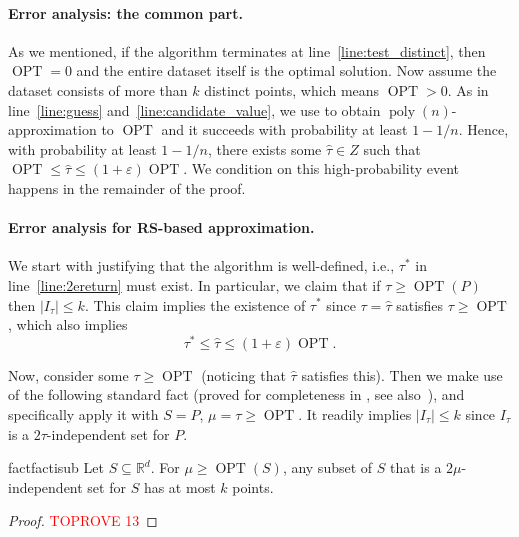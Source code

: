 \documentclass[11pt,letterpaper]{article}
\theoremstyle{plain}
\theoremstyle{definition}
\theoremstyle{remark}
\def\RR{{\mathbb{R}}}
\DeclareMathOperator{\poly}{poly}
\DeclareMathOperator{\OPT}{OPT}
\renewcommand{\epsilon}{\ensuremath{\varepsilon}}
\let\epsilon\varepsilon
\begin{document}
    




    
\paragraph{Error analysis: the common part.}
As we mentioned, if the algorithm terminates at line~\ref{line:test_distinct}, then $\OPT = 0$ and the entire dataset itself is the optimal solution.
Now assume the dataset consists of more than $k$ distinct points, which means $\OPT > 0$. 
As in line~\ref{line:guess} and~\ref{line:candidate_value}, we use  to obtain $\poly(n)$-approximation to $\OPT$
and it succeeds with probability at least $1-1/n$.
Hence, with probability at least $1-1/n$, there exists some $\hat{\tau}\in Z$ such that $\OPT\leq \hat{\tau}\leq (1+\varepsilon)\OPT$. 
We condition on this high-probability event happens in the remainder of the proof.


    
\paragraph{Error analysis for RS-based approximation.} 





We start with justifying that the algorithm is well-defined, i.e., $\tau^*$ in line~\ref{line:2ereturn} must exist.
In particular, we claim that if $\tau \geq \OPT(P)$ then $|I_\tau| \leq k$. 
This claim implies the existence of $\tau^*$ since $\tau = \hat{\tau}$ satisfies $\tau \geq \OPT$,
which also implies
\begin{equation}
    \label{eqn:taustar}
    \tau^* \leq \hat{\tau} \leq (1 + \epsilon) \OPT.
\end{equation}

Now, consider some $\tau\geq \OPT$ (noticing that $\hat{\tau}$ satisfies this). 
Then we make use of the following standard fact (proved for completeness in , see also~\cite{DBLP:journals/jacm/HochbaumS86}),
and specifically apply it with  $S=P$, $\mu = \tau\geq \OPT$.
It readily implies $|I_\tau| \leq k$ since $I_{\tau}$ is a $2\tau$-independent set for $P$.  
    
\begin{restatable}{fact}{factisub}
\label{fact:is_ub}
Let $S \subseteq \RR^d$. For $\mu \geq \OPT(S)$, any subset of $S$ that is a $2\mu$-independent set for $S$ has at most $k$ points. 
\end{restatable}
\begin{proof}\textcolor{red}{TOPROVE 13}\end{proof}
\end{document}
